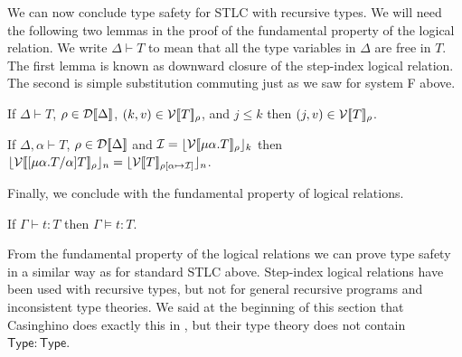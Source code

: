 We can now conclude type safety for STLC with recursive types.  We
will need the following two lemmas in the proof of the fundamental
property of the logical relation.  We write $\Delta \vdash T$ to mean
that all the type variables in $\Delta$ are free in $T$.  The first
lemma is known as downward closure of the step-index logical relation.
The second is simple substitution commuting just as we saw for system
F above.
\begin{lemma}
  \label{lemma:1}
  If $\Delta \vdash T$, $\rho \in \mathcal{D}[\negthinspace[\Delta]\negthinspace]$, $(k,v) \in \mathcal{V}[\negthinspace[T]\negthinspace]_\rho$, and
  $j \leq k$ then $(j,v) \in \mathcal{V}[\negthinspace[T]\negthinspace]_\rho$.
\end{lemma}

\begin{lemma}
  \label{lemma:2}
  If $\Delta, \alpha \vdash T$, $\rho \in \mathcal{D}[\negthinspace[\Delta]\negthinspace]$ and 
  $\mathcal{I} = \lfloor \mathcal{V}[\negthinspace[\mu \alpha . T]\negthinspace]_\rho \rfloor_{k}$ then
  $\lfloor \mathcal{V}[\negthinspace[[\mu \alpha.T/\alpha]T]\negthinspace]_\rho \rfloor_{n} = 
   \lfloor \mathcal{V}[\negthinspace[T]\negthinspace]_{\rho[\alpha \mapsto \mathcal{I}]} \rfloor_{n}$.
\end{lemma}

\noindent
Finally, we conclude with the fundamental property of logical
relations.
\begin{thm}
  \label{thm:fundamental_property}
  If $\Gamma \vdash t : T$ then $\Gamma \models t:T$.
\end{thm}

From the fundamental property of the logical relations we can prove
type safety in a similar way as for standard STLC above.  Step-index
logical relations have been used with recursive types, but not for
general recursive programs and inconsistent type theories.  We said at
the beginning of this section that Casinghino does exactly this in
\cite{Casinghino:2012}, but their type theory does not contain
$\mathsf{Type:Type}$.
